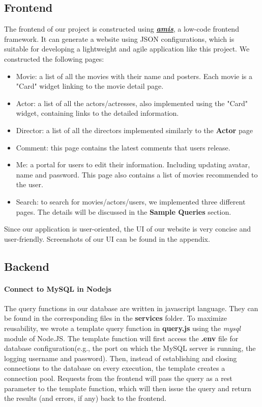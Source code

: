 \begin{CJK*}{UTF8}{gbsn}
\subsection{Frontend}
The frontend of our project is constructed using \textbf{\textit{\href{https://aisuda.bce.baidu.com/amis/zh-CN/docs/index}{amis}}}, a low-code frontend framework. It can generate a website using JSON configurations, which is suitable for developing a lightweight and agile application like this project. We constructed the following pages:
\begin{itemize}
    \item Movie: a list of all the movies with their name and posters. Each movie is a "Card" widget linking to the movie detail page.
    \item Actor: a list of all the actors/actresses, also implemented using the "Card" widget, containing links to the detailed information.
    \item Director: a list of all the directors implemented similarly to the \textbf{Actor} page
    \item Comment: this page contains the latest comments that users release.
    \item Me: a portal for users to edit their information. Including updating avatar, name and password. This page also contains a list of movies recommended to the user.
    \item Search: to search for movies/actors/users, we implemented three different pages. The details will be discussed in the \textbf{Sample Queries} section.
\end{itemize}
\par Since our application is user-oriented, the UI of our website is very concise and user-friendly. Screenshots of our UI can be found in the appendix.


\subsection{Backend}
\paragraph{Connect to MySQL in Nodejs}
The query functions in our database are written in javascript language. They can be found in the corresponding files in the \textbf{services} folder. To maximize reusability, we wrote a template query function in \textbf{query.js} using the \textit{mysql} module of Node.JS. The template function will first access the \textbf{.env} file for database configuration(e.g., the port on which the MySQL server is running, the logging username and password). Then, instead of establishing and closing connections to the database on every execution, the template creates a connection pool. Requests from the frontend will pass the query as a rest parameter to the template function, which will then issue the query and return the results (and errors, if any) back to the frontend.

\end{CJK*}
